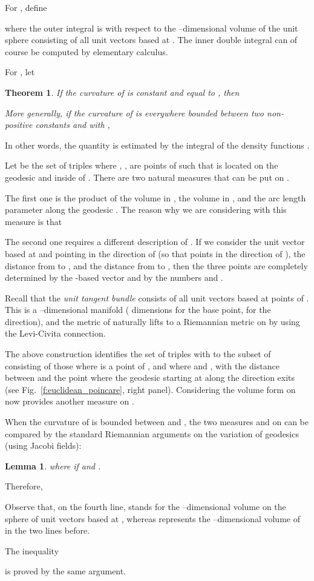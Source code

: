 \documentclass{article}
\newtheorem{lemma}{Lemma}
\newtheorem{theorem}{Theorem}
\newenvironment{proof}
{\noindent {\bf Proof.}}
{}
\begin{document}
For , define 

where the outer integral is with respect to the --dimensional volume of the unit sphere  
consisting of all unit vectors  based at . 
The inner double  integral can of course be computed by elementary calculus. 

For , let


\begin{theorem}
If the curvature of  is constant and equal to , then 

More generally,  if the curvature of  is everywhere
bounded between two non-positive constants  and  with ,

\end{theorem}
In other words, the quantity  is estimated by the integral of the density functions .


\begin{proof}
Let  be the set of triples  where , ,  are points of  
such that  is located on the geodesic  and inside of . 
There are two natural measures that can be put on .

The first one is the product  of the volume in , the volume in , 
and the arc length parameter  along the geodesic . 
The reason why we are considering  with this measure is that


The second one requires a different description of . 
If we consider the unit vector  based at  and pointing in the direction of  
(so that  points in the direction of ), the distance  from  to , 
and the distance  from  to , 
then the three points  are completely determined by the -based vector  
and by the numbers  and . 

Recall that the \emph{unit tangent bundle}  consists of all unit vectors  based at points of . 
This is a --dimensional manifold ( dimensions for the base point,  for the direction), 
and the  metric of   naturally lifts to a Riemannian metric on  by using the Levi-Civita connection. 

The above construction identifies the set  of triples  with  
to the subset of  consisting of those  
where  is a point of , and where  and , 
with  the distance between  and the point  where the geodesic starting at  along the direction  exits  
(see Fig.~\ref{f:euclidean_poincare}, right panel).  
Considering the volume form  on  now provides another measure  on . 

When the curvature of  is bounded between  and , 
the two measures  and  on  can be compared 
by the standard Riemannian arguments on the variation of geodesics (using Jacobi fields):
\begin{lemma}

where  if  and . 
\end{lemma}

Therefore,

Observe that, on the fourth line, 
 stands for the --dimensional volume on the sphere  of unit vectors based at , 
whereas   represents the --dimensional volume of  in the two lines before. 

The inequality 

is proved by the same argument. 
\end{proof}
\end{document}
